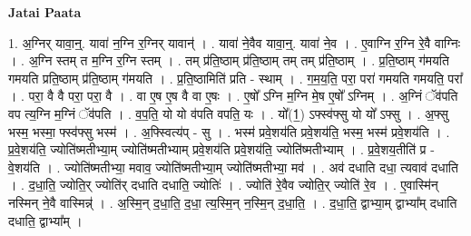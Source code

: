 \documentclass[17pt]{extarticle}
\begin{document}
\textbf{Jatai Paata} \newline

1. अ॒ग्निर् यावा॒न्॒. यावा॑ न॒ग्नि र॒ग्निर् यावान्॑ । . यावा॑ ने॒वैव यावा॒न्॒. यावा॑ ने॒व । . ए॒वाग्नि र॒ग्नि रे॒वै वाग्निः । . अ॒ग्नि स्तम् त म॒ग्नि र॒ग्नि स्तम् । . तम् प्र॑ति॒ष्ठाम् प्र॑ति॒ष्ठाम् तम् तम् प्र॑ति॒ष्ठाम् । . प्र॒ति॒ष्ठाम् ग॑मयति गमयति प्रति॒ष्ठाम् प्र॑ति॒ष्ठाम् ग॑मयति । . प्र॒ति॒ष्ठामिति॑ प्रति - स्थाम् । . ग॒म॒य॒ति॒ परा॒ परा॑ गमयति गमयति॒ परा᳚ । . परा॒ वै वै परा॒ परा॒ वै । . वा ए॒ष ए॒ष वै वा ए॒षः । . ए॒षो᳚ ऽग्नि म॒ग्नि मे॒ष ए॒षो᳚ ऽग्निम् । . अ॒ग्निं ॅव॑पति वप त्य॒ग्नि म॒ग्निं ॅव॑पति । . व॒प॒ति॒ यो यो व॑पति वपति॒ यः । . यो᳚(1॒) ऽफ्स्व॑फ्सु यो यो᳚ ऽफ्सु । . अ॒फ्सु भस्म॒ भस्मा॒ फ्स्व॑फ्सु भस्म॑ । . अ॒फ्स्वित्य॑प् - सु । . भस्म॑ प्रवे॒शय॑ति प्रवे॒शय॑ति॒ भस्म॒ भस्म॑ प्रवे॒शय॑ति । . प्र॒वे॒शय॑ति॒ ज्योति॑ष्मतीभ्या॒म् ज्योति॑ष्मतीभ्याम् प्रवे॒शय॑ति प्रवे॒शय॑ति॒ ज्योति॑ष्मतीभ्याम् । . प्र॒वे॒शय॒तीति॑ प्र - वे॒शय॑ति । . ज्योति॑ष्मतीभ्या॒ मवाव॒ ज्योति॑ष्मतीभ्या॒म् ज्योति॑ष्मतीभ्या॒ मव॑ । . अव॑ दधाति दधा॒ त्यवाव॑ दधाति । . द॒धा॒ति॒ ज्योति॒र् ज्योति॑र् दधाति दधाति॒ ज्योतिः॑ । . ज्योति॑ रे॒वैव ज्योति॒र् ज्योति॑ रे॒व । . ए॒वास्मि॑न् नस्मिन् ने॒वै वास्मिन्न्॑ । . अ॒स्मि॒न् द॒धा॒ति॒ द॒धा॒ त्य॒स्मि॒न् न॒स्मि॒न् द॒धा॒ति॒ । . द॒धा॒ति॒ द्वाभ्या॒म् द्वाभ्या᳚म् दधाति दधाति॒ द्वाभ्या᳚म् । \newline
\end{document}
